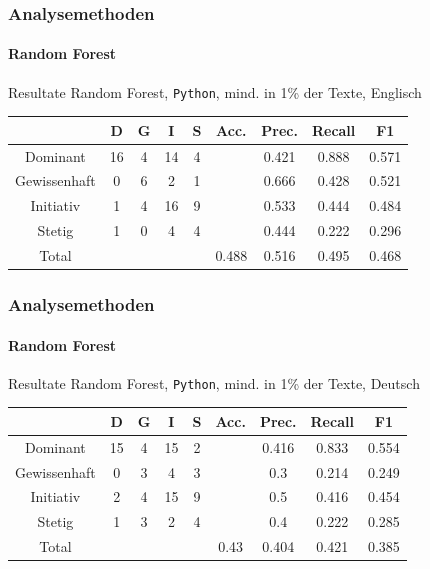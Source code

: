 \begin{frame}
\frametitle{Analysemethoden}
\framesubtitle{Random Forest}
Resultate Random Forest, \texttt{Python}, mind. in 1\% der Texte, Englisch
\begin{center}
\begin{tabular}{|c|c|c|c|c|c|c|c|c|}
\hline
 &  D 	& G	& I & S	& Acc.	& Prec. & Recall	& F1\\
\hline
Dominant & 16 & 4 & 14 & 4 &&0.421 & 0.888 & 0.571 \\
Gewissenhaft & 0 & 6 & 2 & 1&&0.666 & 0.428 & 0.521 \\
Initiativ & 1 & 4 & 16 & 9&&0.533 & 0.444 & 0.484 \\
Stetig & 1 & 0 & 4 & 4&&0.444 & 0.222 & 0.296 \\
\hline
Total 	&		&		& & 		& 0.488		&  0.516 & 0.495 & 0.468\\
\hline
\end{tabular}
\end{center}
\end{frame}
\begin{frame}
\frametitle{Analysemethoden}
\framesubtitle{Random Forest}
Resultate Random Forest, \texttt{Python}, mind. in 1\% der Texte, Deutsch
\begin{center}
\begin{tabular}{|c|c|c|c|c|c|c|c|c|}
\hline
 &  D 	& G	& I & S	& Acc.	& Prec. & Recall	& F1\\
\hline
Dominant & 15 & 4 & 15 & 2 &&0.416 & 0.833 & 0.554 \\
Gewissenhaft & 0 & 3 & 4 & 3&&0.3 & 0.214 & 0.249 \\
Initiativ & 2 & 4 & 15 & 9&&0.5 &0.416 & 0.454 \\
Stetig & 1 & 3 & 2 & 4&&0.4 & 0.222 & 0.285 \\
\hline
Total 	&		&		& & 		& 0.43		&    0.404 & 0.421 & 0.385\\
\hline
\end{tabular}
\end{center}
\end{frame}